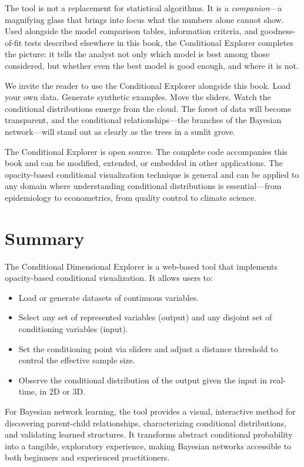 The tool is not a replacement for statistical algorithms. It is a \emph{companion}—a magnifying glass that brings into focus what the numbers alone cannot show. Used alongside the model comparison tables, information criteria, and goodness-of-fit tests described elsewhere in this book, the Conditional Explorer completes the picture: it tells the analyst not only which model is best among those considered, but whether even the best model is good enough, and where it is not.

We invite the reader to use the Conditional Explorer alongside this book. Load your own data. Generate synthetic examples. Move the sliders. Watch the conditional distributions emerge from the cloud. The forest of data will become transparent, and the conditional relationships—the branches of the Bayesian network—will stand out as clearly as the trees in a sunlit grove.

\begin{importantbox}
    The Conditional Explorer is open source. The complete code accompanies this book and can be modified, extended, or embedded in other applications. The opacity-based conditional visualization technique is general and can be applied to any domain where understanding conditional distributions is essential—from epidemiology to econometrics, from quality control to climate science.
\end{importantbox}

\section*{Summary}

The Conditional Dimensional Explorer is a web-based tool that implements opacity-based conditional visualization. It allows users to:

\begin{itemize}
    \item Load or generate datasets of continuous variables.
    \item Select any set of represented variables (output) and any disjoint set of conditioning variables (input).
    \item Set the conditioning point via sliders and adjust a distance threshold to control the effective sample size.
    \item Observe the conditional distribution of the output given the input in real-time, in 2D or 3D.
\end{itemize}

For Bayesian network learning, the tool provides a visual, interactive method for discovering parent-child relationships, characterizing conditional distributions, and validating learned structures. It transforms abstract conditional probability into a tangible, exploratory experience, making Bayesian networks accessible to both beginners and experienced practitioners. 